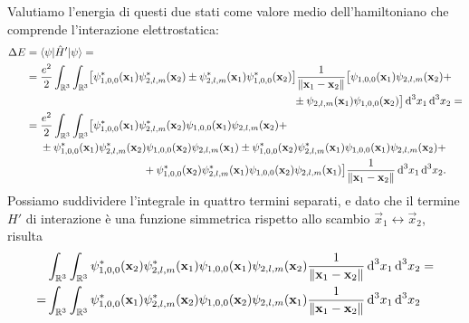 Valutiamo l'energia di questi due stati come valore medio dell'hamiltoniano che comprende l'interazione elettrostatica:
\begin{equation}
    \begin{split}
        \Delta E&=
        \bra{\psi}\op H'\ket{\psi}=\\&=
        \begin{multlined}[t]
            \frac{e^2}2\int_{\R^3}\int_{\R^3}
            \bigl[
                \psi_{1,0,0}^*(\vec x_1)\psi_{2,l,m}^*(\vec x_2)\pm\psi_{2,l,m}^*(\vec x_1)\psi_{1,0,0}^*(\vec x_2)
            \bigr]
            \frac1{\norm{\vec x_1-\vec x_2}}
            \bigl[
                \psi_{1,0,0}(\vec x_1)\psi_{2,l,m}(\vec x_2)+\\\pm\psi_{2,l,m}(\vec x_1)\psi_{1,0,0}(\vec x_2)
            \bigr]
            \,\dd^3 x_1\,\dd^3 x_2=
        \end{multlined}\\&=
        \begin{multlined}[t]
            \frac{e^2}2\int_{\R^3}\int_{\R^3}
            \bigr[
                \psi_{1,0,0}^*(\vec x_1)\psi_{2,l,m}^*(\vec x_2)\psi_{1,0,0}(\vec x_1)\psi_{2,l,m}(\vec x_2)+\\\pm
                \psi_{1,0,0}^*(\vec x_1)\psi_{2,l,m}^*(\vec x_2)\psi_{1,0,0}(\vec x_2)\psi_{2,l,m}(\vec x_1)\pm
                \psi_{1,0,0}^*(\vec x_2)\psi_{2,l,m}^*(\vec x_1)\psi_{1,0,0}(\vec x_1)\psi_{2,l,m}(\vec x_2)+\\+
                \psi_{1,0,0}^*(\vec x_2)\psi_{2,l,m}^*(\vec x_1)\psi_{1,0,0}(\vec x_2)\psi_{2,l,m}(\vec x_1)
            \bigr]
            \frac1{\norm{\vec x_1-\vec x_2}}
            \,\dd^3 x_1\,\dd^3 x_2.
        \end{multlined}
    \end{split}
\end{equation}
Possiamo suddividere l'integrale in quattro termini separati, e dato che il termine $H'$ di interazione è una funzione simmetrica rispetto allo scambio $\vec x_1\leftrightarrow\vec x_2$, risulta
\begin{equation}
    \begin{aligned}
        &\int_{\mathbb{R}^3}\int_{\mathbb{R}^3}
            \psi_{1,0,0}^*(\mathbf{x}_2)\psi_{2,l,m}^*(\mathbf{x}_1)\psi_{1,0,0}(\mathbf{x}_1)\psi_{2,l,m}(\mathbf{x}_2)
            \frac1{\lVert\mathbf{x}_1-\mathbf{x}_2\rVert}
        \,\textup{d}^3 x_1\,\textup{d}^3 x_2=\\
        =&\int_{\mathbb{R}^3}\int_{\mathbb{R}^3}
            \psi_{1,0,0}^*(\mathbf{x}_1)\psi_{2,l,m}^*(\mathbf{x}_2)\psi_{1,0,0}(\mathbf{x}_2)\psi_{2,l,m}(\mathbf{x}_1)
            \frac1{\lVert\mathbf{x}_1-\mathbf{x}_2\rVert}
        \,\textup{d}^3 x_1\,\textup{d}^3 x_2
    \end{aligned}
\end{equation}
